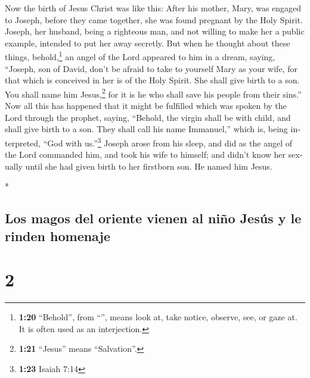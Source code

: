 \begin{paracol}{2}
\begin{otherlanguage}{english}
 Now the birth of Jesus Christ was like this: After his
mother, Mary, was engaged to Joseph, before they came together, she was
found pregnant by the Holy Spirit.  Joseph, her husband,
being a righteous man, and not willing to make her a public example,
intended to put her away secretly.  But when he thought
about these things, behold,\footnote{\textbf{1:20} ``Behold'', from
  ``'', means look at, take notice, observe, see, or gaze
  at. It is often used as an interjection.} an angel of the Lord
appeared to him in a dream, saying, ``Joseph, son of David, don't be
afraid to take to yourself Mary as your wife, for that which is
conceived in her is of the Holy Spirit.  She shall give
birth to a son. You shall name him Jesus,\footnote{\textbf{1:21}
  ``Jesus'' means ``Salvation''.} for it is he who shall save his people
from their sins.''  Now all this has happened that it
might be fulfilled which was spoken by the Lord through the prophet,
saying,  ``Behold, the virgin shall be with child, and
shall give birth to a son. They shall call his name Immanuel,'' which
is, being interpreted, ``God with us.''\footnote{\textbf{1:23} Isaiah
  7:14}  Joseph arose from his sleep, and did as the
angel of the Lord commanded him, and took his wife to himself;
 and didn't know her sexually until she had given birth
to her firstborn son. He named him Jesus.

\end{otherlanguage}

\switchcolumn[0]*

\hypertarget{los-magos-del-oriente-vienen-al-niuxf1o-jesuxfas-y-le-rinden-homenaje}{%
\subsection{Los magos del oriente vienen al niño Jesús y le rinden
homenaje}\label{los-magos-del-oriente-vienen-al-niuxf1o-jesuxfas-y-le-rinden-homenaje}}

\hypertarget{section-2}{%
\section{2}\label{section-2}}


\end{paracol}
